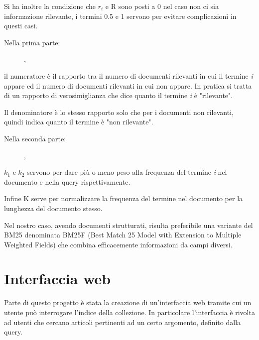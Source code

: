 \documentclass[runningheads]{llncs}
\begin{document}
Si ha inoltre la condizione che $r_{i}$ e R sono posti a 0 nel caso non ci sia informazione rilevante, i termini 0.5 e 1 servono per evitare complicazioni in questi casi.
\vspace{\baselineskip}



Nella prima parte:
\begin{figure}
\vspace{-10mm}
  \centering
{},
\vspace{-10mm}
  \end{figure} 
  
il numeratore \`e il rapporto tra il numero di documenti rilevanti in cui il termine \emph{i} appare ed il numero di documenti rilevanti in cui non appare.
In pratica si tratta di un rapporto di verosimiglianza che dice quanto il termine \emph{i} \`e "rilevante".

Il denominatore \`e lo stesso rapporto solo che per i documenti non rilevanti, quindi indica quanto il termine \`e "non rilevante".

Nella seconda parte:
\begin{figure}
\vspace{-10mm}
  \centering
{},
\vspace{-10mm}
  \end{figure} 
  
$k_{1}$ e $k_{2}$ servono per dare pi\`u o meno peso alla frequenza del termine \emph{i} nel documento e nella query rispettivamente.

Infine K serve per normalizzare la frequenza del termine nel documento per la lunghezza del documento stesso.

\vspace{\baselineskip}

Nel nostro caso, avendo documenti strutturati, risulta preferibile una variante del BM25 denominata BM25F (Best Match 25 Model with Extension to Multiple Weighted Fields) che combina efficacemente informazioni da campi diversi.

\vspace{3in}

\section{Interfaccia web}

Parte di questo progetto \`e stata la creazione di un'interfaccia web
tramite cui un utente pu\`o interrogare l'indice della collezione.
In particolare l'interfaccia \`e rivolta ad utenti che cercano articoli
pertinenti ad un certo argomento, definito dalla query.
\end{document}
